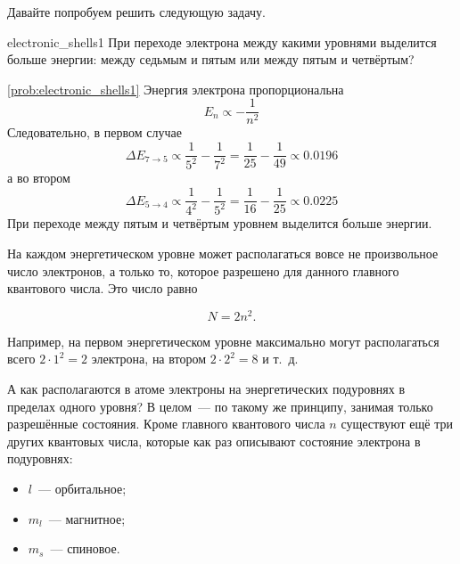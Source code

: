 Давайте попробуем решить следующую задачу.

\begin{problem}{}{electronic_shells1}
    При переходе электрона между какими уровнями выделится больше энергии: между седьмым и пятым или между пятым и четвёртым?
    \begin{sol}{\ref{prob:electronic_shells1}}
        Энергия электрона пропорциональна
        \begin{equation*}
            E_n \propto -\frac{1}{n^2}
        \end{equation*}
        Следовательно, в первом случае
        \begin{equation*}
            \varDelta E_{7 \rightarrow 5} \propto \frac{1}{5^2} - \frac{1}{7^2} = \frac{1}{25} - \frac{1}{49} \propto \num{0,0196}
        \end{equation*}
        а во втором
        \begin{equation*}
            \varDelta E_{5 \rightarrow 4} \propto \frac{1}{4^2} - \frac{1}{5^2} = \frac{1}{16} - \frac{1}{25} \propto \num{0,0225}
        \end{equation*}
        При переходе между пятым и четвёртым уровнем выделится больше энергии.
    \end{sol}
\end{problem}

На каждом энергетическом уровне может располагаться вовсе не произвольное число электронов, а только то, которое разрешено для данного главного квантового числа. Это число равно

\begin{equation}
    \label{eq:number_of_electrons_at_the_main_level}
    \boxed{N = 2n^2}.
\end{equation}

Например, на первом энергетическом уровне максимально могут располагаться всего $2 \cdot 1^2 = 2$ электрона, на втором $2 \cdot 2^2 = 8$ и т.~д.

А как располагаются в атоме электроны на энергетических подуровнях в пределах одного уровня? В целом~--- по такому же принципу, занимая только разрешённые состояния. Кроме главного квантового числа $n$ существуют ещё три других квантовых числа, которые как раз описывают состояние электрона в подуровнях:

\begin{itemize}
    \item $l$~--- орбитальное;
    \item $m_l$~--- магнитное;
    \item $m_s$~--- спиновое.
\end{itemize}

